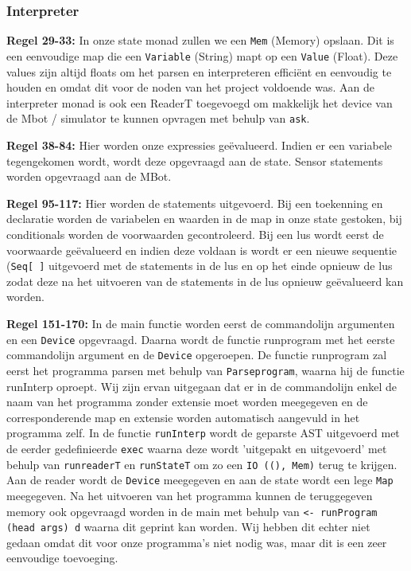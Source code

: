 \documentclass[12pt, titlepage]{article}
\begin{document}
\subsubsection{Interpreter}
\begin{description}

\item{\bf Regel 29-33:} In onze state monad zullen we een \texttt{Mem} (Memory) opslaan. Dit is een eenvoudige map die een \texttt{Variable} (String) mapt op een \texttt{Value} (Float). Deze values zijn altijd floats om het parsen en interpreteren efficiënt en eenvoudig te houden en omdat dit voor de noden van het project voldoende was. Aan de interpreter monad is ook een ReaderT toegevoegd om makkelijk het device van de Mbot / simulator te kunnen opvragen met behulp van \texttt{ask}.
\newline
\item{\bf Regel 38-84:} Hier worden onze expressies geëvalueerd. Indien er een variabele tegengekomen wordt, wordt deze opgevraagd aan de state. Sensor statements worden opgevraagd aan de MBot.
\newline
\item{\bf Regel 95-117:} Hier worden de statements uitgevoerd. Bij een toekenning en declaratie worden de variabelen en waarden in de map in onze state gestoken, bij conditionals worden de voorwaarden gecontroleerd. Bij een lus wordt eerst de voorwaarde geëvalueerd en indien deze voldaan is wordt er een nieuwe sequentie (\texttt{Seq[ ]} uitgevoerd met de statements in de lus en op het einde opnieuw de lus zodat deze na het uitvoeren van de statements in de lus opnieuw geëvalueerd kan worden.
\newline
\item{\bf Regel 151-170:} In de main functie worden eerst de commandolijn argumenten en een \texttt{Device} opgevraagd. Daarna wordt de functie runprogram met het eerste commandolijn argument en de \texttt{Device} opgeroepen. De functie runprogram zal eerst het programma parsen met behulp van \texttt{Parseprogram}, waarna hij de functie runInterp oproept. Wij zijn ervan uitgegaan dat er in de commandolijn enkel de naam van het programma zonder extensie moet worden meegegeven en de corresponderende map en extensie worden automatisch aangevuld in het programma zelf. In de functie \texttt{runInterp} wordt de geparste AST uitgevoerd met de eerder gedefinieerde \texttt{exec} waarna deze wordt 'uitgepakt en uitgevoerd' met behulp van \texttt{runreaderT} en \texttt{runStateT} om zo een \texttt{IO ((), Mem)} terug te krijgen. Aan de reader wordt de \texttt{Device} meegegeven en aan de state wordt een lege \texttt{Map} meegegeven. Na het uitvoeren van het programma kunnen de teruggegeven memory ook opgevraagd worden in de main met behulp van \texttt{<- runProgram (head args) d} waarna dit geprint kan worden. Wij hebben dit echter niet gedaan omdat dit voor onze programma's niet nodig was, maar dit is een zeer eenvoudige toevoeging.
\end{description}
\end{document}
